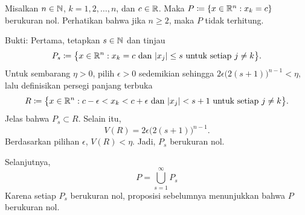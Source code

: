 \begin{example} \label{mv:example:planenull}
Misalkan $n \in {\mathbb{N}}$, $k=1,2,\ldots,n$, dan $c \in {\mathbb{R}}$.
Maka $P \coloneqq \{x \in {\mathbb{R}}^n : x_k=c\}$ berukuran nol. Perhatikan bahwa
jika $n\geq2$, maka $P$ tidak terhitung.

Bukti:
Pertama, tetapkan $s \in {\mathbb{N}}$ dan tinjau
\begin{equation*}
P_s \coloneqq \bigl\{x \in {\mathbb{R}}^n : x_k=c \text{ dan } \lvert {x_j} \rvert\leq s
\text{ untuk setiap } j\neq k\bigr\} .
\end{equation*}
Untuk sembarang $\eta>0$, pilih $\epsilon>0$ sedemikian sehingga
$2\epsilon{\bigl(2(s+1)\bigr)}^{n-1}<\eta$, lalu definisikan persegi panjang
terbuka
\begin{equation*}
R \coloneqq \bigl\{x \in {\mathbb{R}}^n : c-\epsilon<x_k<c+\epsilon \text{ dan }
\lvert {x_j} \rvert<s+1 \text{ untuk setiap } j\neq k\bigr\} .
\end{equation*}
Jelas bahwa $P_s\subset R$. Selain itu,
\begin{equation*}
V(R) = 2\epsilon {\bigl(2(s+1)\bigr)}^{n-1} .
\end{equation*}
Berdasarkan pilihan $\epsilon$, $V(R)<\eta$. Jadi, $P_s$ berukuran nol.

Selanjutnya,
\begin{equation*}
P = \bigcup_{s=1}^\infty P_s
\end{equation*}
Karena setiap $P_s$ berukuran nol, proposisi sebelumnya menunjukkan bahwa $P$
berukuran nol.
\end{example}

